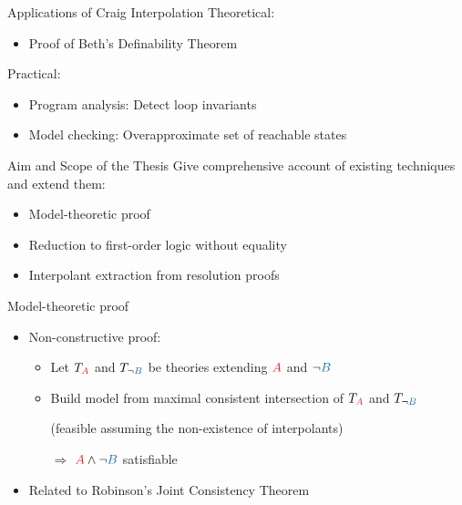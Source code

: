 \documentclass[final,hyperref={pdfpagelabels=true}]{beamer}
\newcommand{\colOne}[1]{ {\color{TuInfRed}#1}}
\newcommand{\colTwo}[1]{ {\color{TuWienBlue}#1}}
\newcommand{\colA}[1]{ \colOne{#1} }
\newcommand{\colB}[1]{ \colTwo{#1} }
\newcommand{\itemizeOnBlockStart}{
		\vspace*{-0.5em}
	}
\begin{document}
\begin{frame}
\begin{columns}[t]
\begin{column}{\mycolwidth}
			\begin{block}{Applications of Craig Interpolation} 
				Theoretical:
				\begin{itemize}
					\item Proof of Beth's Definability Theorem
				\end{itemize}
				Practical:
				\begin{itemize}
					\item Program analysis: Detect loop invariants
					\item Model checking: Overapproximate set of reachable states %
				\end{itemize}
			\end{block}


			\begin{block}{Aim and Scope of the Thesis}
				Give comprehensive account of existing techniques and extend them:
				\begin{itemize}
					\item Model-theoretic proof 
					\item Reduction to first-order logic without equality
					\item Interpolant extraction from resolution proofs
				\end{itemize}
			\end{block}

			\begin{block}{Model-theoretic proof}
				\itemizeOnBlockStart

				\begin{itemize}
					\item Non-constructive proof:
						\begin{itemize}
							\item Let $T_\colA{A}$ and $T_{\lnot \colB{B}}$ be theories extending $\colA A$ and $\lnot \colB{B}$
							\item Build model from maximal consistent intersection of $T_\colA{A}$ and $T_{\lnot \colB{B}}$

								(feasible assuming the non-existence of interpolants)

								$\Rightarrow$ $\colA A \land \lnot \colB B$ satisfiable
						\end{itemize}
					\item Related to Robinson's Joint Consistency Theorem
				\end{itemize}

			\end{block}



\end{column}
\end{columns}
\end{frame}
\end{document}
